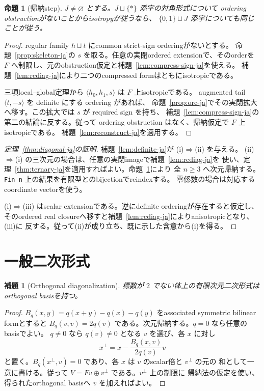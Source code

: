 \documentclass[uplatex,dvipdfmx]{jsarticle}
\newtheorem{proposition}[theorem]{命題}
\newtheorem{lemma}[theorem]{補題}
\theoremstyle{definition}
\theoremstyle{remark}
\begin{document}
\begin{proposition}[帰納step]\label{prop:step-ja}
$J\ne\varnothing$ とする。$J\sqcup\{*\}$ 添字の対角形式について
ordering obstructionがないことからisotropyが従うなら、
$\{0,1\}\sqcup J$ 添字についても同じことが従う。
\end{proposition}
\begin{proof}
regular family $h\sqcup t$ にcommon strict-sign orderingがないとする。
命題~\ref{prop:skeleton-ja}の $s$ を取る。任意の実閉ordered extensionで、そのorderを
$F$ へ制限し、元のobstruction仮定と補題~\ref{lem:compress-sign-ja}を使える。
補題~\ref{lem:rcdiag-ja}により二つのcompressed formはともにisotropicである。

三項local--global定理から $\langle h_0,h_1,s\rangle$ は $F$ 上isotropicである。
augmented tail $\langle t,-s\rangle$ を definite にする ordering があれば、
命題~\ref{prop:orc-ja}でその実閉拡大へ移す。この拡大では $s$ が required sign を持ち、
補題~\ref{lem:compress-sign-ja}の第二の結論に反する。従って ordering obstruction はなく、帰納仮定で
$F$ 上isotropicである。
補題~\ref{lem:reconstruct-ja}を適用する。
\end{proof}

\begin{proof}[定理~\ref{thm:diagonal-ja}の証明]
補題~\ref{lem:definite-ja}が (i)$\Rightarrow$(ii) を与える。
(ii)$\Rightarrow$(i) の三次元の場合は、任意の実閉imageで補題~\ref{lem:rcdiag-ja}を
使い、定理~\ref{thm:ternary-ja}を適用すればよい。命題~\ref{prop:step-ja}により
全 $n\ge3$ へ次元帰納する。\texttt{Fin n} 上の結果を有限型とのbijectionでreindexする。
零係数の場合は対応するcoordinate vectorを使う。

(i)$\Rightarrow$(iii) はscalar extensionである。逆にdefinite orderingが存在すると仮定し、
そのordered real closureへ移すと補題~\ref{lem:rcdiag-ja}によりanisotropicとなり、(iii)に
反する。従って(ii)が成り立ち、既に示した含意から(i)を得る。
\end{proof}

\section{一般二次形式}

\begin{lemma}[Orthogonal diagonalization]\label{lem:diagonalization-ja}
標数が $2$ でない体上の有限次元二次形式はorthogonal basisを持つ。
\end{lemma}
\begin{proof}
$B_q(x,y)=q(x+y)-q(x)-q(y)$ をassociated symmetric bilinear formとすると
$B_q(v,v)=2q(v)$ である。次元帰納する。$q=0$ なら任意のbasisでよい。
$q\ne0$ なら $q(v)\ne0$ となる $v$ を選び、各 $x$ に対し
\[
  x^\perp=x-\frac{B_q(x,v)}{2q(v)}v
\]
と置く。$B_q(x^\perp,v)=0$ であり、各 $x$ は $v$ のscalar倍と $v^\perp$ の元の
和として一意に書ける。従って $V=Fv\oplus v^\perp$ である。$v^\perp$ 上の制限に
帰納法の仮定を使い、得られたorthogonal basisへ $v$ を加えればよい。
\end{proof}
\end{document}
